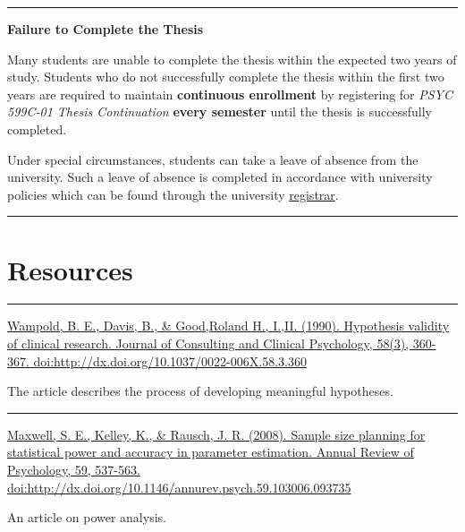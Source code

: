 \documentclass[openany]{book}
\begin{document}
\begin{center}\rule{0.5\linewidth}{0.5pt}\end{center}

\textbf{Failure to Complete the Thesis}

Many students are unable to complete the thesis within the expected two years of study. Students who do not successfully complete the thesis within the first two years are required to maintain \textbf{continuous enrollment} by registering for \emph{PSYC 599C-01 Thesis Continuation} \textbf{every semester} until the thesis is successfully completed.

Under special circumstances, students can take a leave of absence from the university. Such a leave of absence is completed in accordance with university policies which can be found through the university \href{https://www.callutheran.edu/students/registrar/}{registrar}.

\begin{center}\rule{0.5\linewidth}{0.5pt}\end{center}

\hypertarget{resources}{%
\chapter{Resources}\label{resources}}

\begin{center}\rule{0.5\linewidth}{0.5pt}\end{center}

\href{https://ezproxy.callutheran.edu/login?url=https://search-proquest-com.ezproxy.callutheran.edu/docview/210630433?accountid=9839}{Wampold, B. E., Davis, B., \& Good,Roland H., I.,II. (1990). Hypothesis validity of clinical research. Journal of Consulting and Clinical Psychology, 58(3), 360-367. doi:http://dx.doi.org/10.1037/0022-006X.58.3.360}

The article describes the process of developing meaningful hypotheses.

\begin{center}\rule{0.5\linewidth}{0.5pt}\end{center}

\href{https://ezproxy.callutheran.edu/login?url=https://search-proquest-com.ezproxy.callutheran.edu/docview/205846542?accountid=9839}{Maxwell, S. E., Kelley, K., \& Rausch, J. R. (2008). Sample size planning for statistical power and accuracy in parameter estimation. Annual Review of Psychology, 59, 537-563. doi:http://dx.doi.org/10.1146/annurev.psych.59.103006.093735}

An article on power analysis.


\end{document}
